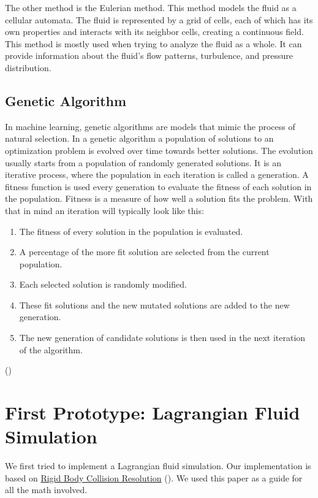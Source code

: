 \documentclass[a4paper,12pt,titlepage]{article}
\begin{document}
The other method is the Eulerian method. This method models the fluid as a
cellular automata. The fluid is represented by a grid of cells, each of which
has its own properties and interacts with its neighbor cells, creating a continuous
field. This method is mostly used when trying to analyze the fluid as a whole.
It can provide information about the fluid's flow patterns, turbulence, and pressure distribution. 

\subsection{Genetic Algorithm} \label{genalg}
In machine learning, genetic algorithms are models that mimic the process of natural selection.
In a genetic algorithm a population of solutions to an optimization problem is evolved over time towards better solutions.
The evolution usually starts from a population of randomly generated solutions.
It is an iterative process, where the population in each iteration is called a generation.
A fitness function is used every generation to evaluate the fitness of each solution in the population.
Fitness is a measure of how well a solution fits the problem.
With that in mind an iteration will typically look like this:
\begin{enumerate}
	\item{The fitness of every solution in the population is evaluated.}
	\item{A percentage of the more fit solution are selected from the current population.}
	\item{Each selected solution is randomly modified.}
	\item {These fit solutions and the new mutated solutions are added to the new generation.}
	\item{The new generation of candidate solutions is then used in the next iteration of the algorithm.}
\end{enumerate}
(\cite{genalg})

\pagebreak
\section{First Prototype: Lagrangian Fluid Simulation}
We first tried to implement a Lagrangian fluid simulation.
Our implementation is based on \hyperlink{http://www.hakenberg.de/diffgeo/collision_resolution.htm}{Rigid Body Collision Resolution}
(\cite{hakenberg}). We used this paper as a guide for all the math involved.
\end{document}
